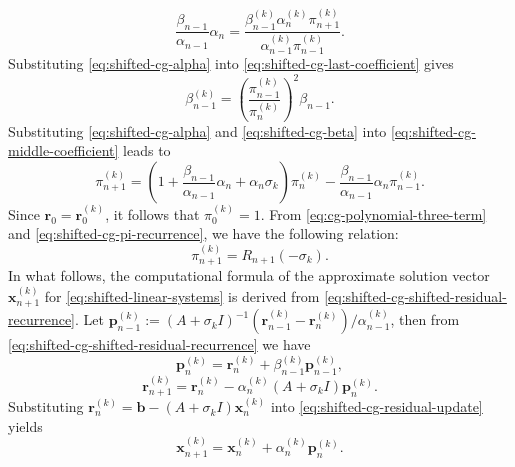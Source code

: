 \begin{equation}\label{eq:shifted-cg-last-coefficient}\frac{\beta_{n-1}}{\alpha_{n-1}}\alpha_n=\frac{\beta_{n-1}^{(k)}\alpha_n^{(k)}\pi_{n+1}^{(k)}}{\alpha_{n-1}^{(k)}\pi_{n-1}^{(k)}}.\end{equation}
{Substituting \eqref{eq:shifted-cg-alpha} into \eqref{eq:shifted-cg-last-coefficient} gives}
\begin{equation}\label{eq:shifted-cg-beta}\beta_{n-1}^{(k)}=\left(\frac{\pi_{n-1}^{(k)}}{\pi_n^{(k)}}\right)^2\beta_{n-1}.\end{equation}
{Substituting \eqref{eq:shifted-cg-alpha} and \eqref{eq:shifted-cg-beta} into \eqref{eq:shifted-cg-middle-coefficient} leads to}
\begin{equation}\label{eq:shifted-cg-pi-recurrence}\pi_{n+1}^{(k)}=\left(1+\frac{\beta_{n-1}}{\alpha_{n-1}}\alpha_n+\alpha_n\sigma_k\right)\pi_n^{(k)}-\frac{\beta_{n-1}}{\alpha_{n-1}}\alpha_n\pi_{n-1}^{(k)}.\end{equation}
{Since $\bm r_0=\bm r_0^{(k)}$, it follows that $\pi_0^{(k)}=1$. From \eqref{eq:cg-polynomial-three-term} and \eqref{eq:shifted-cg-pi-recurrence}, we have the following relation:}
\begin{equation}\label{eq:shifted-cg-polynomial-evaluation}\pi_{n+1}^{(k)}=R_{n+1}(-\sigma_k).\end{equation}
{In what follows, the computational formula of the approximate solution vector $\bm x_{n+1}^{(k)}$ for \eqref{eq:shifted-linear-systems} is derived from \eqref{eq:shifted-cg-shifted-residual-recurrence}. Let $\bm p_{n-1}^{(k)}:=(A+\sigma_k I)^{-1}(\bm r_{n-1}^{(k)}-\bm r_n^{(k)})/\alpha_{n-1}^{(k)}$, then from \eqref{eq:shifted-cg-shifted-residual-recurrence} we have}
\begin{equation}\label{eq:shifted-cg-direction-recurrence}\bm p_n^{(k)}=\bm r_n^{(k)}+\beta_{n-1}^{(k)}\bm p_{n-1}^{(k)},\end{equation}
\begin{equation}\label{eq:shifted-cg-residual-update}\bm r_{n+1}^{(k)}=\bm r_n^{(k)}-\alpha_n^{(k)}(A+\sigma_k I)\bm p_n^{(k)}.\end{equation}
{Substituting $\bm r_n^{(k)}=\bm b-(A+\sigma_k I)\bm x_n^{(k)}$ into \eqref{eq:shifted-cg-residual-update} yields}
\begin{equation}\label{eq:shifted-cg-solution-update}\bm x_{n+1}^{(k)}=\bm x_n^{(k)}+\alpha_n^{(k)}\bm p_n^{(k)}.\end{equation}
